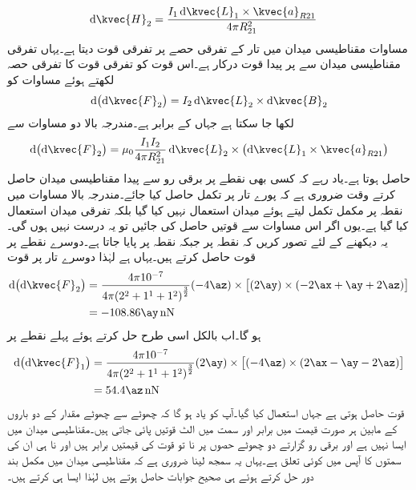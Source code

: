 \begin{align*}
\dif \kvec{H}_2&=\frac{I_1 \dif \kvec{L}_1 \times \kvec{a}_{R21}}{4 \pi R_{21}^2}
\end{align*}
مساوات  مقناطیسی میدان  میں تار کے تفرقی حصے پر تفرقی قوت دیتا ہے۔یہاں تفرقی مقناطیسی میدان  سے  پر  پیدا قوت درکار ہے۔اس قوت کو تفرقی قوت کا تفرقی حصہ  لکھتے ہوئے مساوات  کو 
\begin{align*}
\dif \left(\dif \kvec{F}_2 \right)=I_2 \dif \kvec{L}_2 \times \dif \kvec{B}_2
\end{align*}
لکھا جا سکتا ہے جہاں  کے برابر ہے۔مندرجہ بالا دو مساوات سے
\begin{align}\label{مساوات_امالہ_تفرقی_تفرقی_قوت}
\dif \left(\dif \kvec{F}_2 \right)=\mu_0 \frac{I_1 I_2}{4\pi R_{21}^2} \dif \kvec{L}_2 \times \left(\dif \kvec{L}_1 \times \kvec{a}_{R21} \right)
\end{align}
حاصل ہوتا ہے۔یاد رہے کہ کسی بھی نقطے پر برقی رو سے پیدا مقناطیسی میدان حاصل کرتے وقت ضروری ہے کہ پورے تار پر تکمل حاصل کیا جائے۔مندرجہ بالا مساوات میں نقطہ  پر مکمل تکمل لیتے ہوئے میدان  استعمال نہیں کیا گیا بلکہ تفرقی میدان  استعمال کیا گیا ہے۔یوں اگر اس مساوات سے قوتیں حاصل کی جائیں تو یہ درست نہیں ہوں گی۔یہ دیکھنے کے لئے تصور کریں کہ نقطہ  پر  جبکہ نقطہ  پر  پایا جاتا ہے۔دوسرے نقطے پر قوت حاصل کرتے ہیں۔یہاں  ہے لہٰذا دوسرے تار پر قوت
\begin{align*}
\dif \left(\dif \kvec{F}_2 \right)&= \frac{4 \pi 10^{-7}}{4\pi {\left(2^2+1^1+1^2\right)}^\frac{3}{2}} (-4\az) \times \left[(2\ay) \times \left( -2\ax+\ay+2\az \right) \right]\\
&=-108.86 \ay \, \si{\nano \newton}
\end{align*}
ہو گا۔اب بالکل اسی طرح حل کرتے ہوئے پہلے نقطے پر
\begin{align*}
\dif \left(\dif \kvec{F}_1 \right)&= \frac{4 \pi 10^{-7}}{4\pi {\left(2^2+1^1+1^2\right)}^\frac{3}{2}} (2\ay)  \times \left[(-4\az)\times \left( 2\ax-\ay-2\az \right) \right]\\
&=54.4 \az \, \si{\nano \newton}
\end{align*}
 قوت حاصل ہوتی ہے جہاں  استعمال کیا گیا۔آپ کو یاد ہو گا کہ  چھوٹے سے چھوٹے مقدار کے دو باروں کے مابین ہر صورت قیمت میں برابر اور سمت میں الٹ قوتیں پائی جاتی ہیں۔مقناطیسی میدان میں ایسا نہیں ہے اور برقی رو گزارتے دو چھوٹے حصوں پر نا تو قوت کی قیمتیں برابر ہیں اور نا ہی ان کی سمتوں کا آپس میں کوئی تعلق ہے۔یہاں یہ سمجھ لینا ضروری ہے کہ مقناطیسی میدان میں مکمل بند دور حل کرتے ہوئے ہی صحیح جوابات حاصل ہوتے ہیں لہٰذا ایسا ہی کرتے ہیں۔

